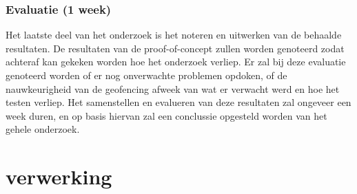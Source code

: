 \subsection{Evaluatie (1 week)}
Het laatste deel van het onderzoek is het noteren en uitwerken van de behaalde resultaten. De resultaten van de proof-of-concept zullen worden genoteerd zodat achteraf kan gekeken worden hoe het onderzoek verliep. Er zal bij deze evaluatie genoteerd worden of er nog onverwachte problemen opdoken, of de nauwkeurigheid van de geofencing afweek van wat er verwacht werd en hoe het testen verliep. Het samenstellen en evalueren van deze resultaten zal ongeveer een week duren, en op basis hiervan zal een conclussie opgesteld worden van het gehele onderzoek.
































\chapter{verwerking}%
\label{ch:verwerking}